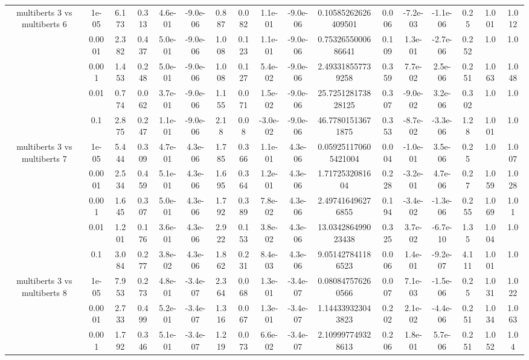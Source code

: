 \begin{tabular}{|c|c|c|c|c|c|c|c|c|c|c|c|c|c|c|c|c|}
\hline
\multirow{5}{*}{multiberts 3 vs multiberts 6} & 1e-05 & 6.173 & 0.313 & 4.6e-01 & -9.0e-06 & 0.887 & 0.082 & 1.1e-01 & -9.0e-06 & 0.10585262626409501 & 0.006 & -7.2e-03 & -1.1e-06 & 0.25 & 1.001 & 1.012 \\
 & 0.0001 & 2.382 & 0.437 & 5.0e-01 & -9.0e-06 & 1.008 & 0.123 & 1.1e-01 & -9.0e-06 & 0.7532655000686641 & 0.109 & 1.3e-01 & -2.7e-06 & 0.252 & 1.0 & 1.0 \\
 & 0.001 & 1.453 & 0.248 & 5.0e-01 & -9.0e-06 & 1.008 & 0.127 & 5.4e-02 & -9.0e-06 & 2.493318557739258 & 0.359 & 7.7e-02 & 2.5e-06 & 0.251 & 1.063 & 1.048 \\
 & 0.01 & 0.774 & 0.062 & 3.7e-01 & -9.0e-06 & 1.155 & 0.071 & 1.5e-02 & -9.0e-06 & 25.725128173828125 & 0.307 & -9.0e-02 & 3.2e-06 & 0.302 & 1.0 & 1.0 \\
 & 0.1 & 2.875 & 0.247 & 1.1e-01 & -9.0e-06 & 2.18 & 0.08 & -3.0e-02 & -9.0e-06 & 46.77801513671875 & 0.353 & -8.7e-02 & -3.3e-06 & 1.28 & 1.001 & 1.0 \\
\hline
\multirow{5}{*}{multiberts 3 vs multiberts 7} & 1e-05 & 5.444 & 0.309 & 4.7e-01 & 4.3e-06 & 1.785 & 0.366 & 1.1e-01 & 4.3e-06 & 0.059251170605421004 & 0.004 & -1.0e-01 & 3.5e-06 & 0.25 & 1.0 & 1.007 \\
 & 0.0001 & 2.534 & 0.459 & 5.1e-01 & 4.3e-06 & 1.695 & 0.364 & 1.2e-01 & 4.3e-06 & 1.7172532081604 & 0.228 & -3.2e-01 & 4.7e-06 & 0.27 & 1.059 & 1.028 \\
 & 0.001 & 1.645 & 0.307 & 5.0e-01 & 4.3e-06 & 1.792 & 0.389 & 7.8e-02 & 4.3e-06 & 2.497416496276855 & 0.194 & -3.4e-02 & -1.3e-06 & 0.255 & 1.069 & 1.01 \\
 & 0.01 & 1.201 & 0.176 & 3.6e-01 & 4.3e-06 & 2.922 & 0.153 & 3.8e-02 & 4.3e-06 & 13.034286499023438 & 0.325 & 3.7e-02 & -6.7e-10 & 1.35 & 1.004 & 1.0 \\
 & 0.1 & 3.084 & 0.277 & 3.8e-02 & 4.3e-06 & 1.862 & 0.231 & 8.4e-03 & 4.3e-06 & 9.051427841186523 & 0.006 & 1.4e-01 & -9.2e-07 & 4.111 & 1.001 & 1.0 \\
\hline
\multirow{5}{*}{multiberts 3 vs multiberts 8} & 1e-05 & 7.953 & 0.273 & 4.8e-01 & -3.4e-07 & 2.364 & 0.068 & 1.3e-01 & -3.4e-07 & 0.080847576260566 & 0.007 & 7.1e-03 & -1.5e-06 & 0.25 & 1.031 & 1.022 \\
 & 0.0001 & 2.733 & 0.499 & 5.2e-01 & -3.4e-07 & 1.316 & 0.067 & 1.3e-01 & -3.4e-07 & 1.144339323043823 & 0.202 & 2.1e-02 & -4.4e-06 & 0.251 & 1.034 & 1.063 \\
 & 0.001 & 1.792 & 0.346 & 5.1e-01 & -3.4e-07 & 1.219 & 0.073 & 6.6e-02 & -3.4e-07 & 2.109997749328613 & 0.206 & 1.8e-01 & 5.7e-06 & 0.251 & 1.052 & 1.04 \\

\end{tabular}
